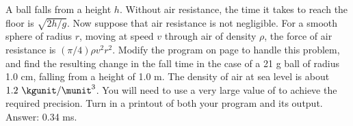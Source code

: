   A ball falls from a height $h$. Without air resistance, the time it takes
  to reach the floor is $\sqrt{2h/g}$. 
  Now suppose
  that air resistance is not negligible. For a smooth sphere of radius $r$, moving
  at speed $v$ through air of density $\rho$, the force of air resistance
  is $(\pi/4)\rho v^2 r^2$. Modify the program \verb@meteor@ on page  \pageref{meteorlisting} to handle this problem,
  and find the resulting change in the fall time in the case of a 21 g ball of radius 1.0 cm,
  falling from a height of 1.0 m. The density of air at sea level is about $1.2\ \kgunit/\munit^3$.
  You will need to use a very large value of \verb@n@ to achieve the required precision.
  Turn in a printout of both your program and its output.
  Answer: 0.34 ms.
